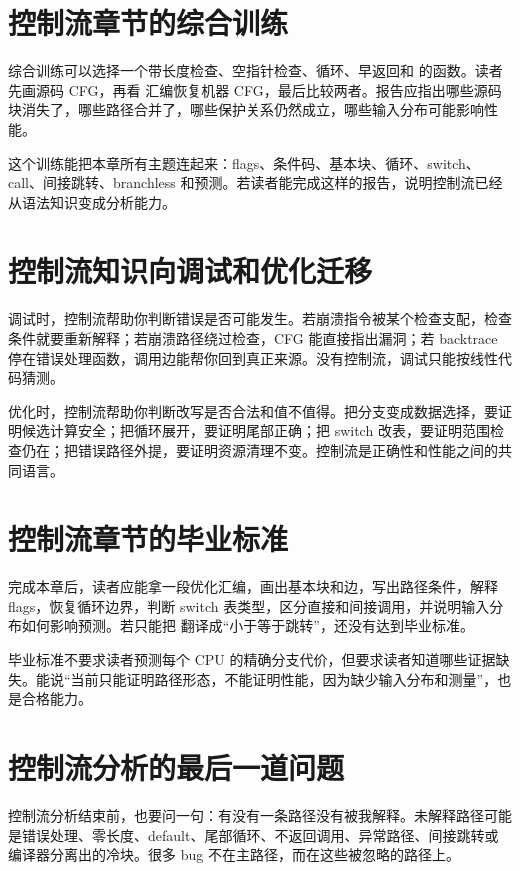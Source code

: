 \section{控制流章节的综合训练}

综合训练可以选择一个带长度检查、空指针检查、循环、早返回和  的函数。读者先画源码 CFG，再看  汇编恢复机器 CFG，最后比较两者。报告应指出哪些源码块消失了，哪些路径合并了，哪些保护关系仍然成立，哪些输入分布可能影响性能。

这个训练能把本章所有主题连起来：flags、条件码、基本块、循环、switch、call、间接跳转、branchless 和预测。若读者能完成这样的报告，说明控制流已经从语法知识变成分析能力。

\section{控制流知识向调试和优化迁移}

调试时，控制流帮助你判断错误是否可能发生。若崩溃指令被某个检查支配，检查条件就要重新解释；若崩溃路径绕过检查，CFG 能直接指出漏洞；若 backtrace 停在错误处理函数，调用边能帮你回到真正来源。没有控制流，调试只能按线性代码猜测。

优化时，控制流帮助你判断改写是否合法和值不值得。把分支变成数据选择，要证明候选计算安全；把循环展开，要证明尾部正确；把 switch 改表，要证明范围检查仍在；把错误路径外提，要证明资源清理不变。控制流是正确性和性能之间的共同语言。

\section{控制流章节的毕业标准}

完成本章后，读者应能拿一段优化汇编，画出基本块和边，写出路径条件，解释 flags，恢复循环边界，判断 switch 表类型，区分直接和间接调用，并说明输入分布如何影响预测。若只能把  翻译成“小于等于跳转”，还没有达到毕业标准。

毕业标准不要求读者预测每个 CPU 的精确分支代价，但要求读者知道哪些证据缺失。能说“当前只能证明路径形态，不能证明性能，因为缺少输入分布和测量”，也是合格能力。

\section{控制流分析的最后一道问题}

控制流分析结束前，也要问一句：有没有一条路径没有被我解释。未解释路径可能是错误处理、零长度、default、尾部循环、不返回调用、异常路径、间接跳转或编译器分离出的冷块。很多 bug 不在主路径，而在这些被忽略的路径上。

